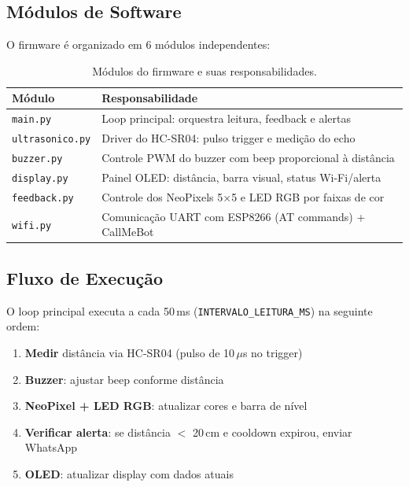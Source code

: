 \documentclass[12pt, a4paper]{article}
\begin{document}
\subsection{Módulos de Software}

O firmware é organizado em 6 módulos independentes:

\begin{table}[H]
\centering
\caption{Módulos do firmware e suas responsabilidades.}
\begin{tabular}{lp{9cm}}
  \toprule
  \textbf{Módulo} & \textbf{Responsabilidade} \\
  \midrule
  \texttt{main.py} & Loop principal: orquestra leitura, feedback e alertas \\
  \texttt{ultrasonico.py} & Driver do HC-SR04: pulso trigger e medição do echo \\
  \texttt{buzzer.py} & Controle PWM do buzzer com beep proporcional à distância \\
  \texttt{display.py} & Painel OLED: distância, barra visual, status Wi-Fi/alerta \\
  \texttt{feedback.py} & Controle dos NeoPixels 5$\times$5 e LED RGB por faixas de cor \\
  \texttt{wifi.py} & Comunicação UART com ESP8266 (AT commands) + CallMeBot \\
  \bottomrule
\end{tabular}
\end{table}

\subsection{Fluxo de Execução}

O loop principal executa a cada 50\,ms (\texttt{INTERVALO\_LEITURA\_MS}) na seguinte ordem:

\begin{enumerate}
  \item \textbf{Medir} distância via HC-SR04 (pulso de 10\,$\mu$s no trigger)
  \item \textbf{Buzzer}: ajustar beep conforme distância
  \item \textbf{NeoPixel + LED RGB}: atualizar cores e barra de nível
  \item \textbf{Verificar alerta}: se distância $<$ 20\,cm e cooldown expirou, enviar WhatsApp
  \item \textbf{OLED}: atualizar display com dados atuais
\end{enumerate}
\end{document}

